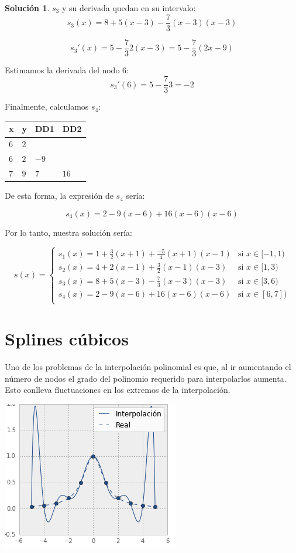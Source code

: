 \documentclass[11pt,spanish,]{article}
\theoremstyle{definition} \newtheorem*{definicion}{Definición}
\newtheorem*{solucion}{Solución}
\begin{document}
\begin{solucion}
$s_3$ y su derivada quedan en su intervalo:
$$s_3(x)=8+5(x-3)- \frac{7}{3} (x-3)(x-3)$$

$$s_3'(x)=5-\frac{7}{3}2(x-3)=5-\frac{7}{3}(2x-9)$$

Estimamos la derivada del nodo 6:
$$s_3'(6)=5-\frac{7}{3}3 = -2$$

Finalmente, calculamos $s_4$:

\begin{table}[h]
\centering
\begin{tabular}{llll}
x & y & DD1 & DD2\\
\hline
$6$ & $2$  &       & \\
$6$ & $2$  & $-9$  & \\
$7$ & $9$  & $7$   & $16$ \\
\hline
\end{tabular}
\end{table}

De esta forma, la expresión de $s_4$ sería:

$$s_4(x)=2 -9(x-6)+16(x-6)(x-6)$$

Por lo tanto, nuestra solución sería:


$$s(x)=
\begin{cases}
s_1(x)=1+\frac{3}{2}(x+1)+\frac{-5}{4}(x+1)(x-1)   & \text{si } x\in {[-1,1)}\\
s_2(x)=4+2(x-1)+\frac{3}{2}(x-1)(x-3)             & \text{si } x\in {[1,3)}\\
s_3(x)=8+5(x-3)- \frac{7}{3} (x-3)(x-3)           & \text{si } x\in {[3,6)}\\
s_4(x)=2 -9(x-6)+16(x-6)(x-6) & \text{si } x\in {[6,7])} \\
\end{cases}
$$
\end{solucion}

\pagebreak

\section{Splines cúbicos}\label{splines-cuxfabicos}

Uno de los problemas de la interpolación polinomial es que, al ir
aumentando el número de nodos el grado del polinomio requerido para
interpolarlos aumenta. Esto conlleva fluctuaciones en los extremos de la
interpolación.

\begin{center}
\includegraphics[scale=0.65]{problema.png}
\end{center}
\end{document}
